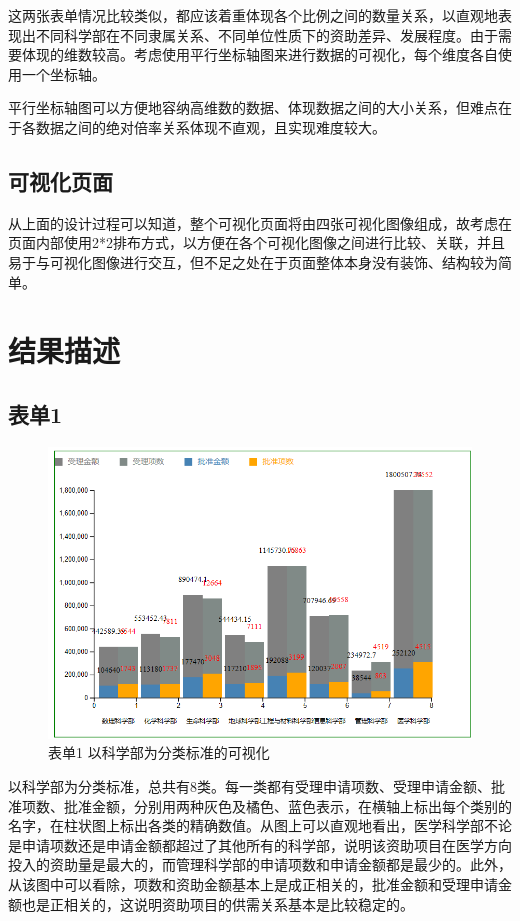 \documentclass[a4paper,11pt,UTF8]{ctexart}
\begin{document}
这两张表单情况比较类似，都应该着重体现各个比例之间的数量关系，以直观地表现出不同科学部在不同隶属关系、不同单位性质下的资助差异、发展程度。由于需要体现的维数较高。考虑使用平行坐标轴图来进行数据的可视化，每个维度各自使用一个坐标轴。

平行坐标轴图可以方便地容纳高维数的数据、体现数据之间的大小关系，但难点在于各数据之间的绝对倍率关系体现不直观，且实现难度较大。

\subsection{可视化页面}

从上面的设计过程可以知道，整个可视化页面将由四张可视化图像组成，故考虑在页面内部使用2*2排布方式，以方便在各个可视化图像之间进行比较、关联，并且易于与可视化图像进行交互，但不足之处在于页面整体本身没有装饰、结构较为简单。

\section{结果描述}

\subsection{表单1}

\begin{figure}[h]
\centering
\includegraphics[scale=0.4]{QQ20191028155318.png}
\caption{表单1 以科学部为分类标准的可视化}
\end{figure}

以科学部为分类标准，总共有8类。每一类都有受理申请项数、受理申请金额、批准项数、批准金额，分别用两种灰色及橘色、蓝色表示，在横轴上标出每个类别的名字，在柱状图上标出各类的精确数值。从图上可以直观地看出，医学科学部不论是申请项数还是申请金额都超过了其他所有的科学部，说明该资助项目在医学方向投入的资助量是最大的，而管理科学部的申请项数和申请金额都是最少的。此外，从该图中可以看除，项数和资助金额基本上是成正相关的，批准金额和受理申请金额也是正相关的，这说明资助项目的供需关系基本是比较稳定的。
\end{document}
